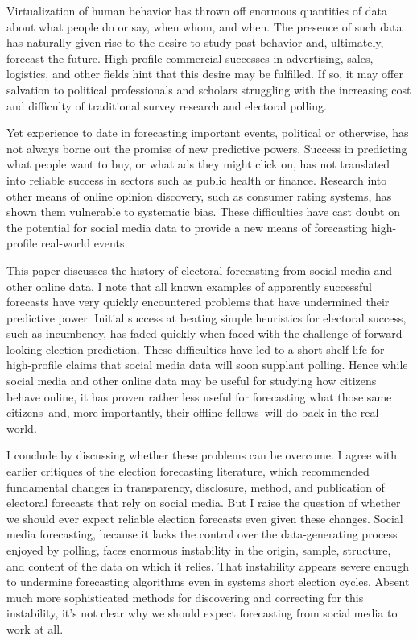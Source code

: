 \documentclass{article}
\begin{document}
Virtualization of human behavior has thrown off enormous quantities of
data about what people do or say, when whom, and when. The presence of
such data has naturally given rise to the desire to study past behavior and,
ultimately, forecast the future. High-profile commercial successes in
advertising, sales, logistics, and other fields hint that this desire
may be fulfilled. If so, it may offer salvation to political
professionals and scholars struggling with the increasing cost and
difficulty of traditional survey research and electoral polling.

Yet experience to date in forecasting important events, political or
otherwise, has not always borne out the promise of new predictive
powers. Success in predicting what people want to buy, or what ads
they might click on, has not translated into reliable success in
sectors such as public health or finance. Research into other means of
online opinion discovery, such as consumer rating systems, has shown
them vulnerable to systematic bias. These difficulties have cast doubt
on the potential for social media data to provide a new means of
forecasting high-profile real-world events.

This paper discusses the history of electoral forecasting from social
media and other online data. I note that all
known examples of apparently successful forecasts have very quickly
encountered problems that have undermined their predictive
power. Initial success at beating simple heuristics for electoral
success, such as incumbency, has faded quickly when faced with the
challenge of forward-looking election prediction. These difficulties have led to a short
shelf life for  high-profile claims that social media data
will soon supplant polling. Hence while
social media and other online data may be useful for studying how
citizens behave online, it has proven rather less useful for
forecasting what those same citizens--and, more importantly, their
offline fellows--will do back in the real world.

I conclude by discussing whether these problems can be overcome. I
agree with earlier critiques of the election forecasting literature, which
recommended fundamental changes in transparency, disclosure, method, and
publication of electoral forecasts that rely on social media. But I
raise the question of whether we should ever expect reliable election
forecasts even given these changes. Social media forecasting, because
it lacks the control over the data-generating process enjoyed by
polling, faces enormous instability in the origin, sample, structure,
and content of the data on which it relies. That instability appears
severe enough to undermine forecasting algorithms even in systems
short election cycles. Absent much more sophisticated methods for
discovering and correcting for this instability, it's not clear why we
should expect forecasting from social media to work at all. 
\end{document}
